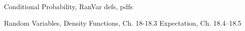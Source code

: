 \documentclass[handout]{mcs}
\begin{document}
\begin{staffnotes}
Conditional Probability, RanVar defs, pdfs
\end{staffnotes}

\renewcommand{\reading}
{Chapter~\bref{ran_var_chap}.\ \emph{Random Variables, Density Functions, Expectation}. }


\begin{staffnotes}
Random Variables, Density Functions, Ch. 18-18.3
Expectation, Ch. 18.4--18.5
\end{staffnotes}











\end{document}
